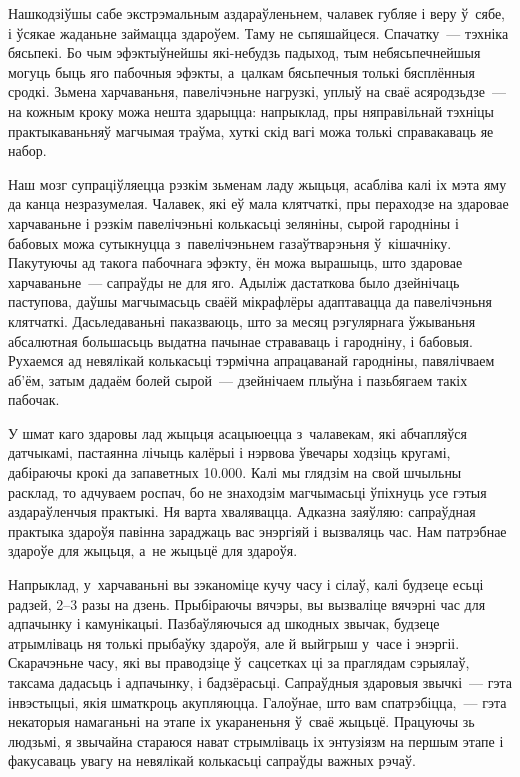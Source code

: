 Нашкодзіўшы сабе экстрэмальным аздараўленьнем, чалавек губляе і веру ў~сябе, і ўсякае жаданьне займацца здароўем. Таму не сьпяшайцеся. Спачатку~--- тэхніка бясьпекі. Бо чым эфэктыўнейшы які-небудзь падыход, тым небясьпечнейшыя могуць быць яго пабочныя эфэкты, а~цалкам бясьпечныя толькі бясплённыя сродкі. Зьмена харчаваньня, павелічэньне нагрузкі, уплыў на сваё асяродзьдзе~--- на кожным кроку можа нешта здарыцца: напрыклад, пры няправільнай тэхніцы практыкаваньняў магчымая траўма, хуткі скід вагі можа толькі справакаваць яе набор.

Наш мозг супраціўляецца рэзкім зьменам ладу жыцьця, асабліва калі іх мэта яму да канца незразумелая. Чалавек, які еў мала клятчаткі, пры пераходзе на здаровае харчаваньне і рэзкім павелічэньні колькасьці зеляніны, сырой гародніны і бабовых можа сутыкнуцца з~павелічэньнем газаўтварэньня ў~кішачніку. Пакутуючы ад такога пабочнага эфэкту, ён можа вырашыць, што здаровае харчаваньне~--- сапраўды не для яго. Адыліж дастаткова было дзейнічаць паступова, даўшы магчымасьць сваёй мікрафлёры адаптавацца да павелічэньня клятчаткі. Дасьледаваньні паказваюць, што за месяц рэгулярнага ўжываньня абсалютная большасьць выдатна пачынае страваваць і гародніну, і бабовыя. Рухаемся ад невялікай колькасьці тэрмічна апрацаванай гародніны, павялічваем аб'ём, затым дадаём болей сырой~--- дзейнічаем плыўна і пазьбягаем такіх пабочак.

У шмат каго здаровы лад жыцьця асацыюецца з~чалавекам, які абчапляўся датчыкамі, пастаянна лічыць калёрыі і нэрвова ўвечары ходзіць кругамі, дабіраючы крокі да запаветных 10.000. Калі мы глядзім на свой шчыльны расклад, то адчуваем роспач, бо не знаходзім магчымасьці ўпіхнуць усе гэтыя аздараўленчыя практыкі. Ня варта хвалявацца. Адказна заяўляю: сапраўдная практыка здароўя павінна зараджаць вас энэргіяй і вызваляць час. Нам патрэбнае здароўе для жыцьця, а~не жыцьцё для здароўя.

Напрыклад, у~харчаваньні вы зэканоміце кучу часу і сілаў, калі будзеце есьці радзей, 2--3 разы на дзень. Прыбіраючы вячэры, вы вызваліце вячэрні час для адпачынку і камунікацыі. Пазбаўляючыся ад шкодных звычак, будзеце атрымліваць ня толькі прыбаўку здароўя, але й выйгрыш у~часе і энэргіі. Скарачэньне часу, які вы праводзіце ў~сацсетках ці за праглядам сэрыялаў, таксама дадасьць і адпачынку, і бадзёрасьці. Сапраўдныя здаровыя звычкі~--- гэта інвэстыцыі, якія шматкроць акупляюцца. Галоўнае, што вам спатрэбіцца,~--- гэта некаторыя намаганьні на этапе іх укараненьня ў~сваё жыцьцё. Працуючы зь людзьмі, я звычайна стараюся нават стрымліваць іх энтузіязм на першым этапе і факусаваць увагу на невялікай колькасьці сапраўды важных рэчаў.

